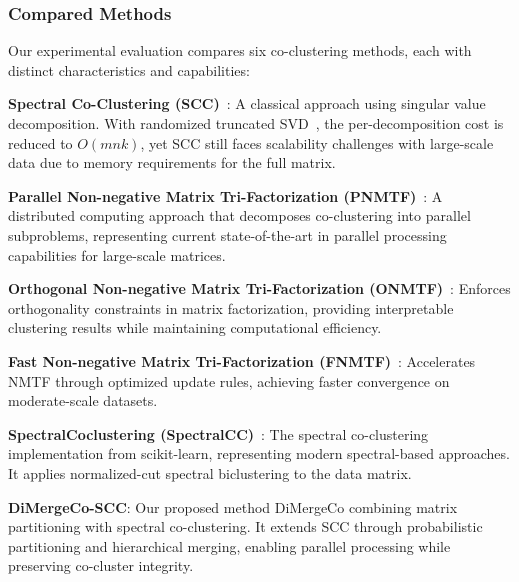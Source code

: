 \documentclass[journal]{IEEEtran}
\theoremstyle{definition}
\theoremstyle{remark} %
\renewcommand{\cite}[1]{~\autocite{#1}}
\begin{document}
\subsubsection{Compared Methods}
Our experimental evaluation compares six co-clustering methods, each with distinct characteristics and capabilities:

\begin{itemize}
    \item \textbf{Spectral Co-Clustering (SCC)}\cite{dhillon2001CoclusteringDocumentsWords}:
          A classical approach using singular value decomposition. {\color{blue}With randomized truncated SVD\cite{halko2011FindingStructureRandomness}, the per-decomposition cost is reduced to $O(mnk)$, yet SCC still} faces scalability challenges with large-scale data due to memory requirements for the full matrix.

    \item \textbf{Parallel Non-negative Matrix Tri-Factorization (PNMTF)}\cite{chen2023ParallelNonNegativeMatrix}:
          A distributed computing approach that decomposes co-clustering into parallel subproblems, representing current state-of-the-art in parallel processing capabilities for large-scale matrices.

    \item \textbf{Orthogonal Non-negative Matrix Tri-Factorization (ONMTF)}\cite{ding2006OrthogonalNonnegativeMatrix}:
          Enforces orthogonality constraints in matrix factorization, providing interpretable clustering results while maintaining computational efficiency.

    \item \textbf{Fast Non-negative Matrix Tri-Factorization (FNMTF)}\cite{kim2011FastNonnegativeMatrix}:
          Accelerates NMTF through optimized update rules, achieving faster convergence on moderate-scale datasets.

    {\color{blue}
    \item \textbf{SpectralCoclustering (SpectralCC)}\cite{sklearn2011}:
          The spectral co-clustering implementation from scikit-learn, representing modern spectral-based approaches. It applies normalized-cut spectral biclustering to the data matrix.
    }

    \item \textbf{DiMergeCo-SCC}:
          Our proposed method DiMergeCo combining matrix partitioning with spectral co-clustering. It extends SCC through probabilistic partitioning and hierarchical merging, enabling parallel processing while preserving co-cluster integrity.


\end{itemize}
\end{document}
